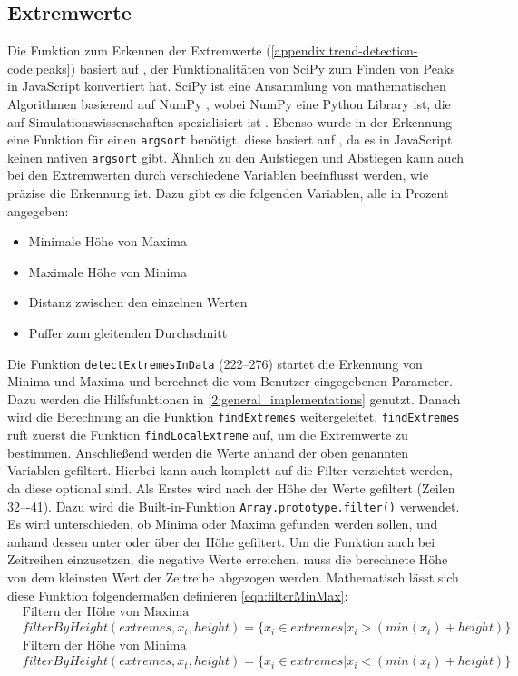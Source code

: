 \subsection{Extremwerte}
Die Funktion zum Erkennen der Extremwerte (\ref{appendix:trend-detection-code:peaks}) basiert auf \cite{SamuelProll.2022}, der Funktionalitäten von SciPy zum Finden von Peaks in JavaScript konvertiert hat. SciPy ist eine Ansammlung von mathematischen Algorithmen basierend auf NumPy \cite{TheSciPycommunity.2023}, wobei NumPy eine Python Library ist, die auf Simulationswissenschaften spezialisiert ist \cite{NumPyDevelopers.2022}. Ebenso wurde in der Erkennung eine Funktion für einen \texttt{argsort} benötigt, diese basiert auf \cite{EranW.2020}, da es in JavaScript keinen nativen \texttt{argsort} gibt. Ähnlich zu den Aufstiegen und Abstiegen kann auch bei den Extremwerten durch verschiedene Variablen beeinflusst werden, wie präzise die Erkennung ist. Dazu gibt es die folgenden Variablen, alle in Prozent angegeben:
\begin{itemize}
    \item Minimale Höhe von Maxima 
    \item Maximale Höhe von Minima
    \item Distanz zwischen den einzelnen Werten
    \item Puffer zum gleitenden Durchschnitt
\end{itemize}
Die Funktion \texttt{detectExtremesInData} (222--276) startet die Erkennung von Minima und Maxima und berechnet die vom Benutzer eingegebenen Parameter. Dazu werden die Hilfsfunktionen in \ref{2:general_implementations} genutzt. Danach wird die Berechnung an die Funktion \texttt{findExtremes} weitergeleitet. \texttt{findExtremes} ruft zuerst die Funktion \texttt{findLocalExtreme} auf, um die Extremwerte zu bestimmen. Anschließend werden die Werte anhand der oben genannten Variablen gefiltert. Hierbei kann auch komplett auf die Filter verzichtet werden, da diese optional sind. Als Erstes wird nach der Höhe der Werte gefiltert (Zeilen 32–-41). Dazu wird die Built-in-Funktion \texttt{Array.prototype.filter()} verwendet. Es wird unterschieden, ob Minima oder Maxima gefunden werden sollen, und anhand dessen unter oder über der Höhe gefiltert. Um die Funktion auch bei Zeitreihen einzusetzen, die negative Werte erreichen, muss die berechnete Höhe von dem kleinsten Wert der Zeitreihe abgezogen werden. Mathematisch lässt sich diese Funktion folgendermaßen definieren \ref{eqn:filterMinMax}:
\begin{equation}
\label{eqn:filterMinMax}
\begin{split}
   & \text{Filtern der Höhe von Maxima}\\
    &filterByHeight(extremes, x_t, height) = \{x_i \in extremes|x_i>(min(x_t)+height)\}\\
   &\text{Filtern der Höhe von Minima}\\
   & filterByHeight(extremes, x_t, height) = \{x_i \in extremes|x_i<(min(x_t)+height)\}\\
   \\
    \end{split}
\end{equation}
